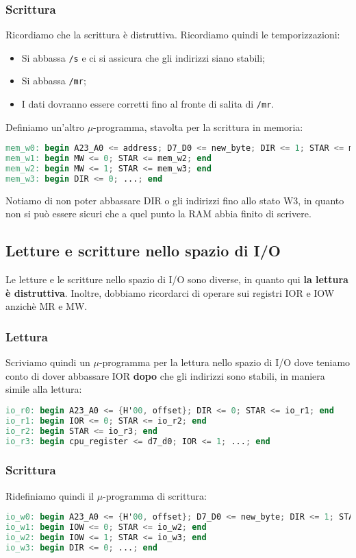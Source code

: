 \documentclass[a4paper,11pt]{article}
\begin{document}
\subsubsection{Scrittura}
Ricordiamo che la scrittura è distruttiva.
Ricordiamo quindi le temporizzazioni:
\begin{itemize}
	\item Si abbassa \lstinline|/s| e ci si assicura che gli indirizzi siano stabili;
	\item Si abbassa \lstinline|/mr|;
	\item I dati dovranno essere corretti fino al fronte di salita di \lstinline|/mr|.
\end{itemize}

Definiamo un'altro $\mu$-programma, stavolta per la scrittura in memoria:
\begin{lstlisting}[language=verilog, style=codestyle]	
mem_w0: begin A23_A0 <= address; D7_D0 <= new_byte; DIR <= 1; STAR <= mem_w1; end
mem_w1: begin MW <= 0; STAR <= mem_w2; end
mem_w2: begin MW <= 1; STAR <= mem_w3; end
mem_w3: begin DIR <= 0; ...; end
\end{lstlisting}
Notiamo di non poter abbassare DIR o gli indirizzi fino allo stato W3, in quanto non si può essere sicuri che a quel punto la RAM abbia finito di scrivere.

\subsection{Letture e scritture nello spazio di I/O}
Le letture e le scritture nello spazio di I/O sono diverse, in quanto qui \textbf{la lettura è distruttiva}.
Inoltre, dobbiamo ricordarci di operare sui registri IOR e IOW anzichè MR e MW.

\subsubsection{Lettura}
Scriviamo quindi un $\mu$-programma per la lettura nello spazio di I/O dove teniamo conto di dover abbassare IOR \textbf{dopo} che gli indirizzi sono stabili, in maniera simile alla lettura:
\begin{lstlisting}[language=verilog, style=codestyle]	
io_r0: begin A23_A0 <= {H'00, offset}; DIR <= 0; STAR <= io_r1; end
io_r1: begin IOR <= 0; STAR <= io_r2; end
io_r2: begin STAR <= io_r3; end
io_r3: begin cpu_register <= d7_d0; IOR <= 1; ...; end
\end{lstlisting}

\subsubsection{Scrittura}
Ridefiniamo quindi il $\mu$-programma di scrittura:
\begin{lstlisting}[language=verilog, style=codestyle]	
io_w0: begin A23_A0 <= {H'00, offset}; D7_D0 <= new_byte; DIR <= 1; STAR <= io_w1; end
io_w1: begin IOW <= 0; STAR <= io_w2; end
io_w2: begin IOW <= 1; STAR <= io_w3; end
io_w3: begin DIR <= 0; ...; end
\end{lstlisting}
\end{document}
